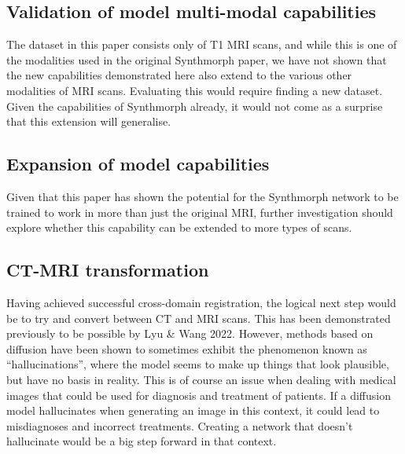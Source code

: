 \subsection{Validation of model multi-modal capabilities}
The dataset in this paper consists only of T1 MRI scans, and while this is one of the modalities used in the original Synthmorph paper, we have not shown that the new capabilities demonstrated here also extend to the various other modalities of MRI scans. Evaluating this would require finding a new dataset. Given the capabilities of Synthmorph already, it would not come as a surprise that this extension will generalise.

\subsection{Expansion of model capabilities}
Given that this paper has shown the potential for the Synthmorph network to be trained to work in more than just the original MRI, further investigation should explore whether this capability can be extended to more types of scans.

\subsection{CT-MRI transformation}
Having achieved successful cross-domain registration, the logical next step would be to try and convert between CT and MRI scans. This has been demonstrated previously to be possible by Lyu \& Wang 2022\cite{diffusion_transformation}. However, methods based on diffusion have been shown to sometimes exhibit the phenomenon known as ``hallucinations''\cite{diffusion_hallucination}, where the model seems to make up things that look plausible, but have no basis in reality. This is of course an issue when dealing with medical images that could be used for diagnosis and treatment of patients. If a diffusion model hallucinates when generating an image in this context, it could lead to misdiagnoses and incorrect treatments. Creating a network that doesn't hallucinate would be a big step forward in that context.
